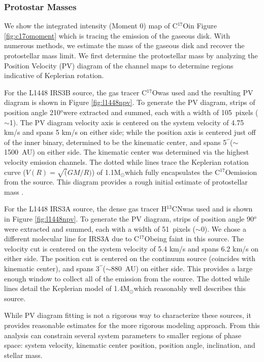 \documentclass[preprint,12pt]{aastex62}
\newcommand{\htcn}{H$^{13}$CN}
\newcommand{\cso}{C$^{17}$O}
\renewcommand{\arcsec}{$^{\prime\prime}$}
\renewcommand{\deg}{$^{o}$}
\newcommand{\ab}{$\sim$}
\newcommand{\solm}{M$_{\odot}$}
\begin{document}
\subsubsection{Protostar Masses}
We show the integrated intensity (Moment 0) map of \cso\space in Figure \ref{fig:c17omoment} which is tracing the emission of the gaseous disk. With numerous methods, we estimate the mass of the gaseous disk and recover the protostellar mass limit. We first determine the protostellar mass by analyzing the Position Velocity (PV) diagram of the channel maps to determine regions indicative of Keplerian rotation.


For the L1448 IRS3B source, the gas tracer \cso\space was used and the resulting PV diagram is shown in Figure \ref{fig:l1448npv}. To generate the PV diagram, strips of position angle 210\deg\space were extracted and summed, each with a width of 105~pixels (\ab1). The PV diagram velocity axis is centered on the system velocity of 4.75 km/s and spans 5 km/s on either side; while the position axis is centered just off of the inner binary, determined to be the kinematic center, and spans 5\arcsec (\ab1500~AU) on either side. The kinematic center was determined via the highest velocity emission channels. The dotted while lines trace the Keplerian rotation curve ($V(R) = \sqrt(GM/R)$) of 1.1\solm which fully encapsulates the \cso\space emission from the source. This diagram provides a rough initial estimate of protostellar mass \citep[e.g.][]{2016MNRAS.459.1892S}.

For the L1448 IRS3A source, the dense gas tracer \htcn\space was used and is shown in Figure \ref{fig:l1448npv}. To generate the PV diagram, strips of position angle 90\deg\space were extracted and summed, each with a width of 51~pixels (\ab0). We chose a different molecular line for IRS3A due to \cso\space being faint in this source. The velocity cut is centered on the system velocity of 5.4 km/s and spans 6.2 km/s on either side. The position cut is centered on the continuum source (coincides with kinematic center), and spans 3\arcsec (\ab880~AU) on either side. This provides a large enough window to collect all of the emission from the source. The dotted while lines detail the Keplerian model of 1.4\solm which reasonably well describes this source. 

While PV diagram fitting is not a rigorous way to characterize these sources, it provides reasonable estimates for the more rigorous modeling approach. From this analysis can constrain several system parameters to smaller regions of phase space: system velocity, kinematic center position, position angle, inclination, and stellar mass.
\end{document}
